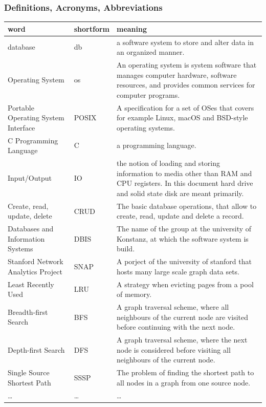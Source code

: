     \subsubsection{Definitions, Acronyms, Abbreviations}
	\begin{longtable}{|>{\raggedright \arraybackslash}p{}||
	>{\raggedright \arraybackslash}p{}|>{\raggedright \arraybackslash}p{}|} \hline

	word & shortform & meaning \\ \hline
	database & db & a software system to store and alter data in an organized manner. \\ \hline
	Operating System & os & An operating system is system software that manages computer hardware, software resources, and provides common services for computer programs. \\ \hline
    Portable Operating System Interface & POSIX & A specification for a set of OSes that covers for example Linux, macOS and BSD-style operating systems. \\ \hline
	C Programming Language & C & a programming language. \\ \hline
	Input/Output & IO & the notion of loading and storing information to media other than RAM and CPU registers. In this document hard drive and solid state disk are meant primarily. \\ \hline
	Create, read, update, delete & CRUD & The basic database operations, that allow to create, read, update and delete a record. \\ \hline
	Databases and Information Systems & DBIS & The name of the group at the university of Konstanz, at which the software system is build. \\ \hline
	Stanford Network Analytics Project & SNAP & A porject of the university of stanford that hosts many large scale graph data sets.  \\ \hline
	Least Recently Used & LRU & A strategy when evicting pages from a pool of memory. \\ \hline
	Breadth-first Search & BFS & A graph traversal scheme, where all neighbours of the current node are visited before continuing with the next node. \\ \hline
	Depth-first Search & DFS & A graph traversal scheme, where the next node is considered before visiting all neighbours of the current node. \\ \hline
	Single Source Shortest Path & SSSP & The problem of finding the shortest path to all nodes in a graph from one source node. \\ \hline
	\dots & \dots & \dots \\ \hline
	\hline
	\end{longtable}

